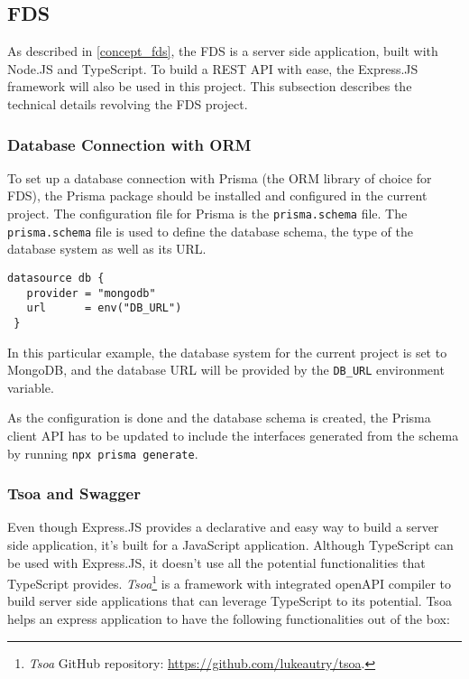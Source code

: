  \subsection{FDS}
 As described in \autoref{concept_fds}, the FDS is a server side application, built with Node.JS and TypeScript. To build a REST API with ease, the Express.JS framework will also be used in this project. This subsection describes the technical details revolving the FDS project. 
  
  \subsubsection{Database Connection with ORM}
   To set up a database connection with Prisma (the ORM library of choice for FDS), the Prisma package should be installed and configured in the current project. The configuration file for Prisma is the \verb;prisma.schema; file. The \verb;prisma.schema; file is used to define the database schema, the type of the database system as well as its URL. 

   \begin{lstlisting}[caption={Configuring database type and URL (Prisma)}]
 datasource db {
   provider = "mongodb"
   url      = env("DB_URL")
 }  
   \end{lstlisting}

   In this particular example, the database system for the current project is set to MongoDB, and the database URL will be provided by the \verb;DB_URL; environment variable.

   As the configuration is done and the database schema is created, the Prisma client API has to be updated to include the interfaces generated from the schema by running \verb;npx prisma generate;.
   
  \subsubsection{Tsoa and Swagger}
  Even though Express.JS provides a declarative and easy way to build a server side application, it's built for a JavaScript application. Although TypeScript can be used with Express.JS, it doesn't use all the potential functionalities that TypeScript provides. \emph{Tsoa}\footnote{\emph{Tsoa} GitHub repository: \url{https://github.com/lukeautry/tsoa}.} is a framework with integrated openAPI compiler to build server side applications that can leverage TypeScript to its potential. Tsoa helps an express application to have the following functionalities out of the box:

